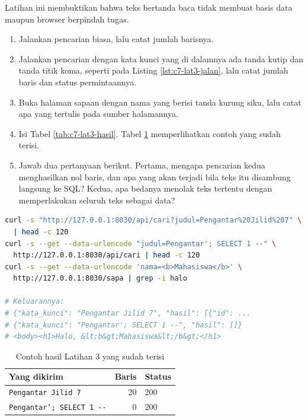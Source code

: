 Latihan ini membuktikan bahwa teks bertanda baca tidak membuat basis data
maupun browser berpindah tugas.

\begin{enumerate}
  \item Jalankan pencarian biasa, lalu catat jumlah barisnya.
  \item Jalankan pencarian dengan kata kunci yang di dalamnya ada tanda kutip
        dan tanda titik koma, seperti pada Listing \ref{lst:c7-lat3-jalan},
        lalu catat jumlah baris dan status permintaannya.
  \item Buka halaman sapaan dengan nama yang berisi tanda kurung siku, lalu
        catat apa yang tertulis pada sumber halamannya.
  \item Isi Tabel \ref{tab:c7-lat3-hasil}. Tabel \ref{tab:c7-lat3-contoh}
        memperlihatkan contoh yang sudah terisi.
  \item Jawab dua pertanyaan berikut. Pertama, mengapa pencarian kedua
        menghasilkan nol baris, dan apa yang akan terjadi bila teks itu
        disambung langsung ke SQL? Kedua, apa bedanya menolak teks tertentu
        dengan memperlakukan seluruh teks sebagai data?
\end{enumerate}

\begin{lstlisting}[language=bash, caption={Mengirim teks bertanda baca sebagai kata kunci, tersedia di \berkas{sources/chapter07/aplikasi.py}}, label={lst:c7-lat3-jalan}]
curl -s "http://127.0.0.1:8030/api/cari?judul=Pengantar%20Jilid%207" \
  | head -c 120
curl -s --get --data-urlencode "judul=Pengantar'; SELECT 1 --" \
  http://127.0.0.1:8030/api/cari | head -c 120
curl -s --get --data-urlencode 'nama=<b>Mahasiswa</b>' \
  http://127.0.0.1:8030/sapa | grep -i halo

# Keluarannya:
# {"kata_kunci": "Pengantar Jilid 7", "hasil": [{"id": ...
# {"kata_kunci": "Pengantar'; SELECT 1 --", "hasil": []}
# <body><h1>Halo, &lt;b&gt;Mahasiswa&lt;/b&gt;</h1>
\end{lstlisting}

\begin{table}[!htb]
  \centering
  \caption{Contoh hasil Latihan 3 yang sudah terisi}
  \label{tab:c7-lat3-contoh}
  \begin{tabularx}{\textwidth}{Xrl}
    \hline
    \textbf{Yang dikirim} & \textbf{Baris} & \textbf{Status} \\
    \hline
    \texttt{Pengantar Jilid 7} & 20 & 200 \\
    \hline
    \texttt{Pengantar'; SELECT 1 -{}-} & 0 & 200 \\
    \hline
  \end{tabularx}
\end{table}

